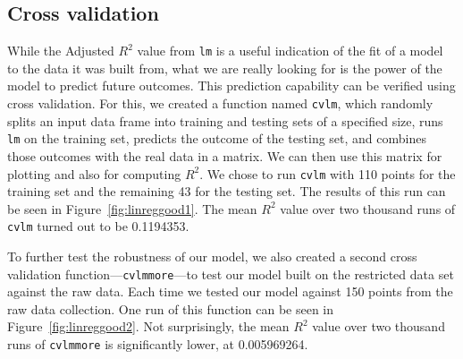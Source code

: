 \documentclass{article}
\begin{document}
\subsection{Cross validation}

While the Adjusted $R^2$ value from \verb=lm= is a useful indication of the fit
of a model to the data it was built from, what we are really looking for is the
power of the model to predict future outcomes. This prediction capability can
be verified using cross validation. For this, we created a function named
\verb=cvlm=, which randomly splits an input data frame into training and
testing sets of a specified size, runs \verb=lm= on the training set, predicts
the outcome of the testing set, and combines those outcomes with the real data
in a matrix. We can then use this matrix for plotting and also for computing
$R^2$. We chose to run \verb=cvlm= with 110 points for the training set and the
remaining 43 for the testing set. The results of this run can be seen in
Figure~\ref{fig:linreggood1}. The mean $R^2$ value over two thousand runs of
\verb=cvlm= turned out to be 0.1194353.

To further test the robustness of our model, we also created a second cross
validation function---\verb=cvlmmore=---to test our model built on the
restricted data set against the raw data. Each time we tested our model against
150 points from the raw data collection. One run of this function can be seen
in Figure~\ref{fig:linreggood2}. Not surprisingly, the mean $R^2$ value over
two thousand runs of \verb=cvlmmore= is significantly lower, at 0.005969264.
\end{document}
